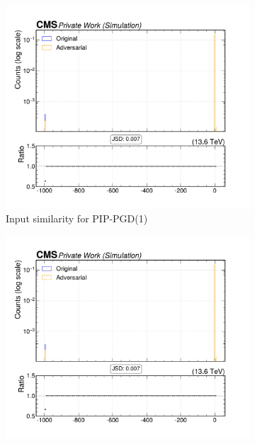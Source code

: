 \begin{figure}[htbp]
  \centering
  \begin{subfigure}[t]{0.32\textwidth}
    \includegraphics[width=\linewidth]{media/output/features/compare/combined_it_1/cmp_global_features_TagVarCSV_trackSumJetDeltaR.pdf}
    \caption*{Input similarity for PIP-PGD(1)}
  \end{subfigure}\hfill
  \begin{subfigure}[t]{0.32\textwidth}
    \includegraphics[width=\linewidth]{media/output/features/compare/combined_it_2/cmp_global_features_TagVarCSV_trackSumJetDeltaR.pdf}

\end{subfigure}
\end{figure}
